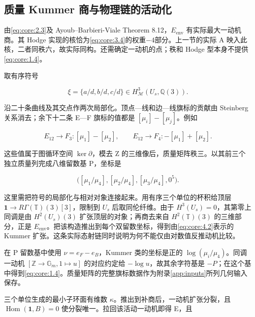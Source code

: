 \documentclass[11pt,a4paper,oneside]{ctexart}
\theoremstyle{cnplain}
\theoremstyle{definition}
\theoremstyle{remark}
\numberwithin{equation}{section}
\begin{document}
\subsection{质量 Kummer 商与物理链的活动化}\label{sec:core:4}

由\eqref{eq:core:2.3}及 Ayoub--Barbieri-Viale Theorem 8.12，\(E_{\mathrm{env}}\) 有实际最大一动机商。其 Hodge 实现的核恰为\eqref{eq:core:3.4}的权重\(- 4\)部分。上一节的实际 A 映入此核，二者同秩六，故实际同构。还需确定一动机的点；秩和 Hodge 型本身不提供\eqref{eq:core:1.4}。

取有序符号

\begin{equation}
\xi=\{a/d,b/d,c/d\}\in H^3_{\mathcal M}(U_s,\mathbb Q(3)).
\end{equation}

沿二十条曲线及其交点作两次局部化。顶点---线和边---线旗标的贡献由 Steinberg 关系消去；余下十二条 E---F 旗标的值都是 \([\mu_i]-[\mu_j]\)。例如

\begin{equation}
E_{12}\to F_3:[\mu_1]-[\mu_2],\qquad
 E_{12}\to F_4:-[\mu_1]+[\mu_2].                         \label{eq:core:4.1}
\end{equation}

这些值属于图循环空间 \(\ker\partial\)，模去 Z 的三维像后，质量矩阵秩三。以其前三个独立质量列完成八维留数基 P，坐标是

\begin{equation}
\bigl([\mu_1/\mu_4],[\mu_2/\mu_4],[\mu_3/\mu_4],0^5\bigr).
                                                               \label{eq:core:4.2}
\end{equation}

这里需把符号的局部化与相对对象连接起来。用有序三个单位的杯积给顶层 \(\mathbf1\to R\Gamma(\mathbb T)(3)[3]\)，限制到 \(U_s\) 后取同伦纤维。由于 \(H^3(U_s)=0\)，其第零上同调是由 \(H^2(U_s)(3)\) 扩张顶层的对象；再商去来自 \(H^2(\mathbb T)(3)\) 的三维部分，正是 \(E_{\mathrm{env}}\)。把该构造推出到每个双留数坐标，得到由\eqref{eq:core:4.2}表示的 Kummer 扩张。这条实际态射链同时说明为何不能仅由对数值反推动机比较。

在 P 留数基中使用 \(\nu=e_F-e_B\)，Kummer 类的坐标是正的 \(\log(\mu_i/\mu_4)\)。同调一动机 \([\mathbb Z\to\mathbb G_m,1\mapsto u]\) 的对应约定给 \(-\log u\)，故其余字符基是 \(- P\)；在这个基中得到\eqref{eq:core:1.4}。质量矩阵的完整旗标数据作为附录\ref{app:inputs}所列几何输入保存。

三个单位生成的最小子环面有维数 \(\kappa \)。推出到补商后，一动机扩张分裂，且 \(\operatorname{Hom}(\mathbf1,B)=0\) 使分裂唯一。拉回该活动一动机即得 E，且
\end{document}
